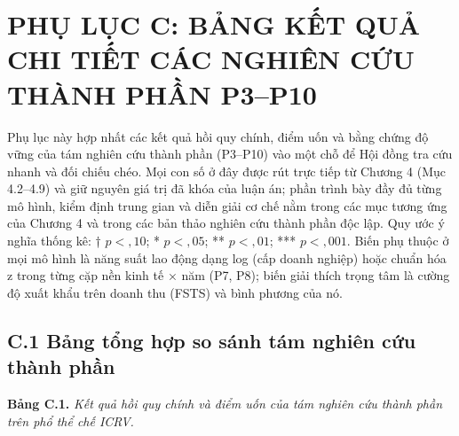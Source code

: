 \documentclass[
  a4paper,
  13pt]{extreport}
\begin{document}
\newpage

\hypertarget{phux1ee5-lux1ee5c-c-bux1ea3ng-kux1ebft-quux1ea3-chi-tiux1ebft-cuxe1c-nghiuxean-cux1ee9u-thuxe0nh-phux1ea7n-p3p10}{%
\chapter{PHỤ LỤC C: BẢNG KẾT QUẢ CHI TIẾT CÁC NGHIÊN CỨU THÀNH PHẦN
P3--P10}\label{phux1ee5-lux1ee5c-c-bux1ea3ng-kux1ebft-quux1ea3-chi-tiux1ebft-cuxe1c-nghiuxean-cux1ee9u-thuxe0nh-phux1ea7n-p3p10}}

Phụ lục này hợp nhất các kết quả hồi quy chính, điểm uốn và bằng chứng
độ vững của tám nghiên cứu thành phần (P3--P10) vào một chỗ để Hội đồng
tra cứu nhanh và đối chiếu chéo. Mọi con số ở đây được rút trực tiếp từ
Chương 4 (Mục 4.2--4.9) và giữ nguyên giá trị đã khóa của luận án; phần
trình bày đầy đủ từng mô hình, kiểm định trung gian và diễn giải cơ chế
nằm trong các mục tương ứng của Chương 4 và trong các bản thảo nghiên
cứu thành phần độc lập. Quy ước ý nghĩa thống kê: † \(p<{,}10\); *
\(p<{,}05\); ** \(p<{,}01\); *** \(p<{,}001\). Biến phụ thuộc ở mọi mô
hình là năng suất lao động dạng log (cấp doanh nghiệp) hoặc chuẩn hóa z
trong từng cặp nền kinh tế × năm (P7, P8); biến giải thích trọng tâm là
cường độ xuất khẩu trên doanh thu (FSTS) và bình phương của nó.

\hypertarget{c.1-bux1ea3ng-tux1ed5ng-hux1ee3p-so-suxe1nh-tuxe1m-nghiuxean-cux1ee9u-thuxe0nh-phux1ea7n}{%
\section{C.1 Bảng tổng hợp so sánh tám nghiên cứu thành
phần}\label{c.1-bux1ea3ng-tux1ed5ng-hux1ee3p-so-suxe1nh-tuxe1m-nghiuxean-cux1ee9u-thuxe0nh-phux1ea7n}}

\textbf{Bảng C.1.} \emph{Kết quả hồi quy chính và điểm uốn của tám
nghiên cứu thành phần trên phổ thể chế ICRV.}
\end{document}
